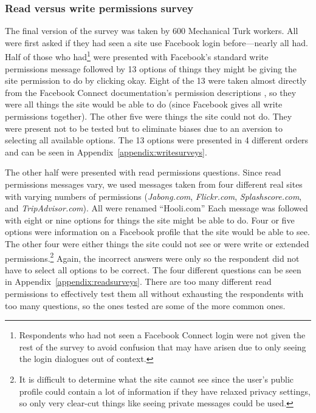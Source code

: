 \documentclass[10pt]{sig-alternate-10pt}
\begin{document}
\subsubsection{Read versus write permissions survey}

The final version of the survey was taken by 600 Mechanical Turk workers. All were first asked if they had seen a site use Facebook login before---nearly all had. Half of those who had\footnote{Respondents who had not seen a Facebook Connect login were not given the rest of the survey to avoid confusion that may have arisen due to only seeing the login dialogues out of context.} were presented with Facebook's standard write permissions message followed by 13 options of things they might be giving the site permission to do by clicking okay. Eight of the 13 were taken almost directly from the Facebook Connect documentation's permission descriptions \cite{fbpermissions}, so they were all things the site would be able to do (since Facebook gives all write permissions together). The other five were things the site could not do. They were present not to be tested but to eliminate biases due to an aversion to selecting all available options. The 13 options were presented in 4 different orders and can be seen in Appendix~\ref{appendix:writesurveys}.

The other half were presented with read permissions questions. Since read permissions messages vary, we used messages taken from four different real sites with varying numbers of permissions (\emph{Jabong.com}, \emph{Flickr.com}, \emph{Splashscore.com}, and \emph{TripAdvisor.com}). All were renamed ``Hooli.com'' Each message was followed with eight or nine options for things the site might be able to do. Four or five options were information on a Facebook profile that the site would be able to see. The other four were either things the site could not see or were write or extended permissions.\footnote{It is difficult to determine what the site cannot see since the user's public profile could contain a lot of information if they have relaxed privacy settings, so only very clear-cut things like seeing private messages could be used.} Again, the incorrect answers were only so the respondent did not have to select all options to be correct. The four different questions can be seen in Appendix~\ref{appendix:readsurveys}. There are too many different read permissions to effectively test them all without exhausting the respondents with too many questions, so the ones tested are some of the more common ones.
\end{document}

